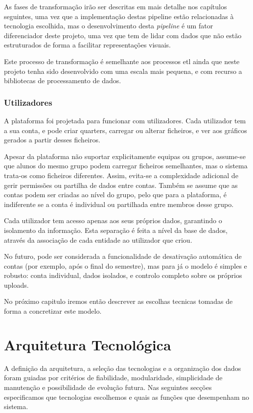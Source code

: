 As fases de transformação irão ser descritas em mais detalhe nos capítulos seguintes, uma vez que a implementação destas pipeline estão relacionadas à tecnologia escolhida, mas o desenvolvimento desta \textit{pipeline} é um fator diferenciador deste projeto, uma vez que tem de lidar com dados que não estão estruturados de forma a facilitar representações visuais. 

Este processo de transformação é semelhante aos processos \gls{etl} ainda que neste projeto tenha sido desenvolvido com uma escala mais pequena, e com recurso a bibliotecas de processamento de dados.

\subsubsection{Utilizadores}

A plataforma foi projetada para funcionar com utilizadores. Cada utilizador tem a sua conta, e pode criar quarters, carregar ou alterar ficheiros, e ver aos gráficos gerados a partir desses ficheiros.

Apesar da plataforma não suportar explicitamente equipas ou grupos, assume-se que alunos do mesmo grupo podem carregar ficheiros semelhantes, mas o sistema trata-os como ficheiros diferentes. Assim, evita-se a complexidade adicional de gerir permissões ou partilha de dados entre contas. Também se assume que as contas podem ser criadas ao nível do grupo, pelo que para a plataforma, é indiferente se a conta é individual ou partilhada entre membros desse grupo.

Cada utilizador tem acesso apenas aos seus próprios dados, garantindo o isolamento da informação. Esta separação é feita a nível da base de dados, através da associação de cada entidade ao utilizador que criou.

No futuro, pode ser considerada a funcionalidade de desativação automática de contas (por exemplo, após o final do semestre), mas para já o modelo é simples e robusto: conta individual, dados isolados, e controlo completo sobre os próprios uploads.

No próximo capitulo iremos então descrever as escolhas tecnicas tomadas de forma a concretizar este modelo.

\section{Arquitetura Tecnológica}
\label{sec:tec}

A definição da arquitetura, a seleção das tecnologias e a organização dos dados foram guiadas por critérios de fiabilidade, modularidade, simplicidade de manutenção e possibilidade de evolução futura.  Nas seguintes secções especificamos que tecnologias escolhemos e quais as funções que desempenham no sistema.


